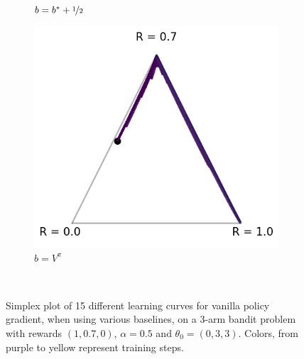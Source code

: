 \begin{figure}[!ht]
\begin{subfigure}[b]{0.245\linewidth}
    \caption{$b = b^\ast + \nicefrac{1}{2}$}
  \end{subfigure}
  \begin{subfigure}[b]{0.245\linewidth}
    \includegraphics[width=\textwidth]{articles/baselines/figs/appendix_figs_3arm_033/vanilla_value_00.png}
    \caption{$b=V^\pi$}
  \end{subfigure}
  \caption{Simplex plot of 15 different learning curves for vanilla policy gradient, when using various baselines, on a 3-arm bandit problem with rewards $(1, 0.7, 0)$, $\alpha = 0.5$ and $\theta_0 = (0, 3, 3)$. Colors, from purple to yellow represent training steps.}~\label{appfig:learning_curves_vpg_033_simplex}
\end{figure}

